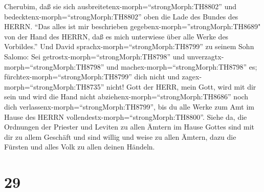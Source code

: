 Cherubim, daß sie sich ausbreitetenx-morph=``strongMorph:TH8802'' und
bedecktenx-morph=``strongMorph:TH8802'' oben die Lade des Bundes des
HERRN.  ``Das alles ist mir beschrieben
gegebenx-morph=''strongMorph:TH8689" von der Hand des HERRN, daß es mich
unterwiese über alle Werke des Vorbildes.''  Und David
sprachx-morph=``strongMorph:TH8799'' zu seinem Sohn Salomo: Sei
getrostx-morph=``strongMorph:TH8798'' und
unverzagtx-morph=``strongMorph:TH8798'' und
machex-morph=``strongMorph:TH8798'' es;
fürchtex-morph=``strongMorph:TH8799'' dich nicht und
zagex-morph=``strongMorph:TH8735'' nicht! Gott der HERR, mein Gott, wird
mit dir sein und wird die Hand nicht
abziehenx-morph=``strongMorph:TH8686'' noch dich
verlassenx-morph=``strongMorph:TH8799'', bis du alle Werke zum Amt im
Hause des HERRN vollendestx-morph=``strongMorph:TH8800''. 
Siehe da, die Ordnungen der Priester und Leviten zu allen Ämtern im
Hause Gottes sind mit dir zu allem Geschäft und sind willig und weise zu
allen Ämtern, dazu die Fürsten und alles Volk zu allen deinen Händeln.

\hypertarget{section-28}{%
\section{29}\label{section-28}}

